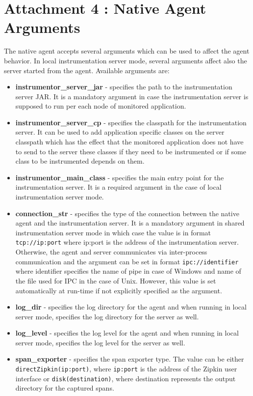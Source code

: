 \chapter*{Attachment 4 : Native Agent Arguments}
\setcounter{page}{1}
The native agent accepts several arguments which can be used to affect the agent behavior. In local instrumentation server mode, several arguments affect also the server started from the agent. Available arguments are:
\begin{itemize}
	\item \textbf{instrumentor\_server\_jar} - specifies the path to the instrumentation server JAR. It is a mandatory argument in case the instrumentation server is supposed to run per each node of monitored application.
	\item \textbf{instrumentor\_server\_cp} - specifies the classpath for the instrumentation server. It can be used to add application specific classes on the server classpath which has the effect that the monitored application does not have to send to the server these classes if they need to be instrumented or if some class to be instrumented depends on them.
	\item \textbf{instrumentor\_main\_class} - specifies the main entry point for the instrumentation server. It is a required argument in the case of local instrumentation server mode.
	\item \textbf{connection\_str} - specifies the type of the connection between the native agent and the instrumentation server. It is a mandatory argument in shared instrumentation server mode in which case the value is in format \texttt{tcp://ip:port} where ip:port is the address of the instrumentation server. Otherwise, the agent and server communicates via inter-process communication and the argument can be set in format \texttt{ipc://identifier} where identifier specifies the name of pipe in case of Windows and name of the file used for IPC in the case of Unix. However, this value is set automatically at run-time if not explicitly specified as the argument.
	\item \textbf{log\_dir} - specifies the log directory for the agent and when running in local server mode, specifies the log directory for the server as well.
	\item \textbf{log\_level} - specifies the log level for the agent and when running in local server mode, specifies the log level for the server as well.
	\item \textbf{span\_exporter} - specifies the span exporter type. The value can be either \linebreak \texttt{directZipkin(ip:port)}, where \texttt{ip:port} is the address of the Zipkin user interface or \texttt{disk(destination)}, where destination represents the output directory for the captured spans. 
	

\end{itemize}

